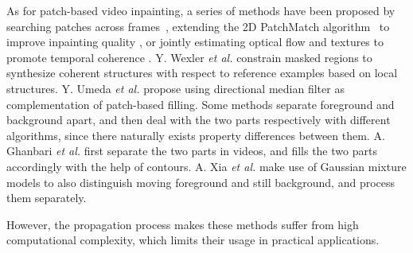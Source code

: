 As for patch-based video inpainting, a series of methods have been proposed by searching patches across frames~\cite{patwardhan2007video}, extending the 2D PatchMatch algorithm~\cite{barnes2009patchmatch} to improve inpainting quality \cite{newson2014video}, or jointly estimating optical flow and textures to promote temporal coherence \cite{huang2016temporally}.
Y. Wexler \emph{et al.} \cite{wexler2007space} constrain masked regions to synthesize coherent structures with respect to reference examples based on local structures. 
Y. Umeda \emph{et al.} \cite{umeda2012removal} propose using directional median filter as complementation of patch-based filling.
Some methods separate foreground and background apart, and then deal with the two parts respectively with different algorithms, since there naturally exists property differences between them.  
A. Ghanbari \emph{et al.} \cite{ghanbari2011contour} first separate the two parts in videos, and fills the two parts accordingly with the help of contours.
A. Xia \emph{et al.} \cite{xia2011exemplar} make use of Gaussian mixture models to also distinguish moving foreground and still background, and process them separately.   
  
However, the propagation process makes these methods suffer from high computational complexity, which limits their usage in practical applications. 




